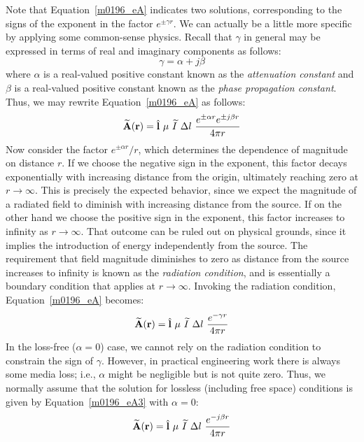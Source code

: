 Note that Equation~\ref{m0196_eA} indicates two solutions, corresponding to the signs of the exponent in the factor $e^{\pm \gamma r}$.
We can actually be a little more specific by applying some common-sense physics.
Recall that $\gamma$ in general may be expressed in terms of real and imaginary components as follows:
%
\begin{equation}
\gamma = \alpha + j\beta
\end{equation}
%
where $\alpha$ is a real-valued positive constant known as the \emph{attenuation constant}
and $\beta$ is a real-valued positive constant known as the \emph{phase propagation constant}.
%
Thus, we may rewrite Equation~\ref{m0196_eA} as follows:
%
\begin{equation}
\widetilde{\bf A}({\bf r}) = \hat{\bf l}~\mu~\widetilde{I}~\Delta l~\frac{ e^{\pm \alpha r} e^{\pm j\beta r} }{4\pi r} 
\label{m0196_eA2}
\end{equation}
%
Now consider the factor $e^{\pm \alpha r}/r$, which determines the dependence of magnitude on distance $r$.
If we choose the negative sign in the exponent, this factor decays exponentially with increasing distance from the origin, ultimately reaching zero at $r\rightarrow\infty$.
This is precisely the expected behavior, since we expect the magnitude of a radiated field to diminish with increasing distance from the source.
If on the other hand we choose the positive sign in the exponent, this factor increases to infinity as $r\rightarrow\infty$.
That outcome can be ruled out on physical grounds, since it implies the introduction of energy independently from the source.
The requirement that field magnitude diminishes to zero as distance from the source increases to infinity is known as the \emph{radiation condition}, 
and is essentially a boundary condition that applies at $r\rightarrow\infty$.
Invoking the radiation condition, Equation~\ref{m0196_eA} becomes:
%
\begin{equation}
\widetilde{\bf A}({\bf r}) = \hat{\bf l}~\mu~\widetilde{I}~\Delta l~\frac{e^{-\gamma r}}{4\pi r}
\label{m0196_eA3}
\end{equation}
%
In the loss-free ($\alpha=0$) case, we cannot rely on the radiation condition to constrain the sign of $\gamma$.  
However, in practical engineering work there is always some media loss; i.e., $\alpha$ might be negligible but is not quite zero.
Thus, we normally assume that the solution for lossless (including free space) conditions is given by Equation~\ref{m0196_eA3} with $\alpha=0$:
%
\begin{equation}
\widetilde{\bf A}({\bf r}) = \hat{\bf l}~\mu~\widetilde{I}~\Delta l~\frac{e^{-j \beta r}}{4\pi r}
\label{m0196_eA4}
\end{equation}

